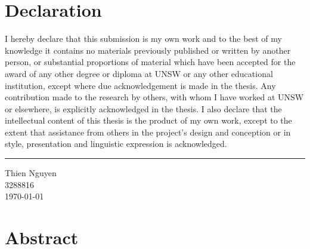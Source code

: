 \section*{Declaration}
I hereby declare that this submission is my own work and to the best of my 
knowledge it contains no materials previously published or written by another 
person, or substantial proportions of material which have been accepted for the 
award of any other degree or diploma at UNSW or any other educational 
institution, except where due acknowledgement is made in the thesis. Any 
contribution made to the research by others, with whom I have worked at 
UNSW or elsewhere, is explicitly acknowledged in the thesis. I also declare that 
the intellectual content of this thesis is the product of my own work, except to 
the extent that assistance from others in the project's design and conception or 
in style, presentation and linguistic expression is acknowledged. \vspace{1cm}
\hrule \vspace{1cm}
Thien Nguyen\\
3288816 \\
\today

\newpage
\section*{Abstract}
\begin{comment}
Automatic Dependant Surveillance-Broadcast (ADS-B) is quickly becoming the primary method that Air Navigation Service Providers (ANSPs) and Air Traffic Control (ATC) systems use to track aircraft during flight. ADS-B requires space based receiving stations in order to track aircraft over regions where ground-based stations cannot be installed, for example, over oceans and poles. Two low risk but high-cost solutions have been proposed as secondary payloads on the Globalstar and Iridium NEXT constellations of commercial telecommunication satellites. Hosting the service in a constellation of low-cost CubeSats will provide a more economical solution, with lower production and launch costs. The key challenge in the design of the system is balancing coverage area, revisit times and link-budgets against cost and CubeSat technological limitations. Thesis B work will take place between November 2013 and June 2014 with a focus on evaluating the performance of simulations of particular orbit configurations.
\end{comment}

